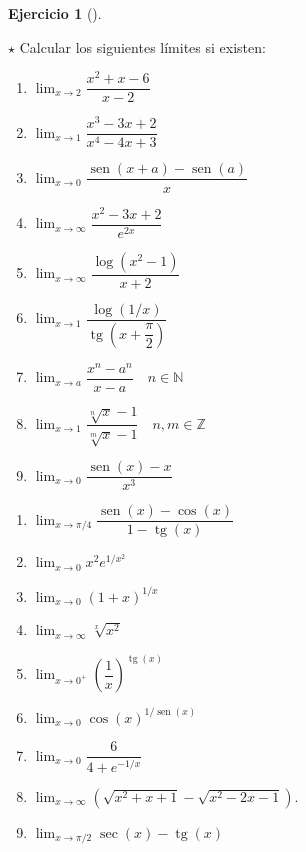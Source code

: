 \documentclass[
  spanish,
  a4paper,
]{scrreport}
\theoremstyle{definition}
\newtheorem{exercise}{Ejercicio}[chapter]
\theoremstyle{remark}
\begin{document}
\begin{exercise}[]\protect\hypertarget{exr-limites-1}{}\label{exr-limites-1}

\(\star\) Calcular los siguientes límites si existen:

\begin{enumerate}
\def\labelenumi{\alph{enumi}.}
\item
  \(\displaystyle \lim_{x\to 2} \dfrac{x^2+x-6}{x-2}\)
\item
  \(\displaystyle \lim_{x\to 1}\dfrac{x^3-3x+2}{x^4-4x+3}\)
\item
  \(\displaystyle \lim_{x\to 0}\dfrac{\operatorname{sen}(x+a)-\operatorname{sen}(a)}{x}\)
\item
  \(\displaystyle \lim_{x\to\infty}\dfrac{x^2-3x+2}{e^{2x}}\)
\item
  \(\displaystyle \lim_{x\to\infty}\dfrac{\log(x^2-1)}{x+2}\)
\item
  \(\displaystyle \lim_{x\to 1}\dfrac{\log(1/x)}{\operatorname{tg}(x+\dfrac{\pi}{2})}\)
\item
  \(\displaystyle \lim_{x\to a}\dfrac{x^n-a^n}{x-a}\quad n\in \mathbb{N}\)
\item
  \(\displaystyle \lim_{x\to 1}\dfrac{\sqrt[n]{x}-1}{\sqrt[m]{x}-1} \quad n,m \in \mathbb{Z}\)
\item
  \(\displaystyle \lim_{x\to 0}\dfrac{\operatorname{sen}(x)-x}{x^3}\)
\end{enumerate}

\begin{enumerate}
\def\labelenumi{\alph{enumi}.}
\setcounter{enumi}{9}
\item
  \(\displaystyle \lim_{x\to \pi/4}\dfrac{\operatorname{sen}(x)-\cos(x)}{1-\operatorname{tg}(x)}\)
\item
  \(\displaystyle \lim_{x\to 0}x^2e^{1/x^2}\)
\item
  \(\displaystyle \lim_{x\to 0}\left(1+x\right)^{1/x}\)
\item
  \(\displaystyle \lim_{x\to \infty} \sqrt[x]{x^2}\)
\item
  \(\displaystyle \lim_{x\to 0^+}\left(\dfrac{1}{x}\right)^{\operatorname{tg}(x)}\)
\item
  \(\displaystyle \lim_{x\to 0}\cos(x)^{1/\operatorname{sen}(x)}\)
\item
  \(\displaystyle \lim_{x\to 0}\dfrac{6}{4+e^{-1/x}}\)
\item
  \(\displaystyle \lim_{x\to \infty}\left(\sqrt{x^2+x+1}-\sqrt{x^2-2x-1}\right)\).
\item
  \(\displaystyle \lim_{x\to \pi/2}\sec(x)-\operatorname{tg}(x)\)
\end{enumerate}

\end{exercise}
\end{document}
